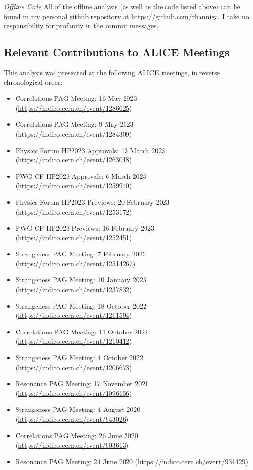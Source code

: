\documentclass[ALICE,manyauthors]{ALICE_analysis_notes}
\begin{document}
\textit{Offline Code}
All of the offline analysis (as well as the code listed above) can be found in my personal github repository at \url{https://github.com/rhanniga}. I take no responsibility for profanity in the commit messages.

\subsection{Relevant Contributions to ALICE Meetings}
This analysis was presented at the following ALICE meetings, in reverse chronological order:

\begin{itemize}
\item Correlations PAG Meeting: 16 May 2023 (\url{https://indico.cern.ch/event/1286625})
\item Correlations PAG Meeting: 9 May 2023 (\url{https://indico.cern.ch/event/1284309})
\item Physics Forum HP2023 Approvals: 13 March 2023 (\url{https://indico.cern.ch/event/1263018})
\item PWG-CF HP2023 Approvals: 6 March 2023 (\url{https://indico.cern.ch/event/1259940})
\item Physics Forum HP2023 Previews: 20 February 2023 (\url{https://indico.cern.ch/event/1253172})
\item PWG-CF HP2023 Previews: 16 February 2023 (\url{https://indico.cern.ch/event/1252451})
\item Strangeness PAG Meeting: 7 February 2023 (\url{https://indico.cern.ch/event/1251426/})
\item Strangeness PAG Meeting: 10 January 2023 (\url{https://indico.cern.ch/event/1237832})
\item Strangeness PAG Meeting: 18 October 2022 (\url{https://indico.cern.ch/event/1211594})
\item Correlations PAG Meeting: 11 October 2022 (\url{https://indico.cern.ch/event/1210412})
\item Strangeness PAG Meeting: 4 October 2022 (\url{https://indico.cern.ch/event/1206673})
\item Resonance PAG Meeting: 17 November 2021 (\url{https://indico.cern.ch/event/1096156})
\item Strangeness PAG Meeting: 4 August 2020 (\url{https://indico.cern.ch/event/943026})
\item Correlations PAG Meeting: 26 June 2020 (\url{https://indico.cern.ch/event/903613})
\item Resonance PAG Meeting: 24 June 2020 (\url{https://indico.cern.ch/event/931429})
\end{itemize}
\end{document}
